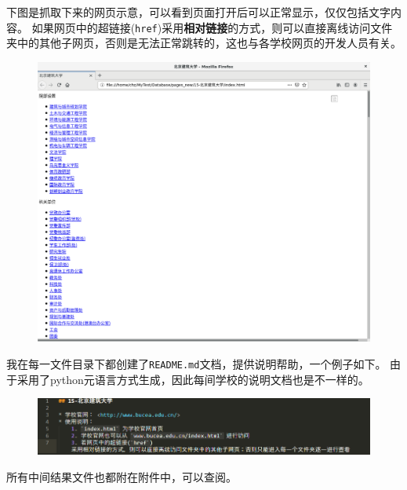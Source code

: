 \documentclass[logo,reportComp]{thesis}
\begin{document}
下图是抓取下来的网页示意，可以看到页面打开后可以正常显示，仅仅包括文字内容。
如果网页中的超链接(\verb'href')采用\textbf{相对链接}的方式，则可以直接离线访问文件夹中的其他子网页，否则是无法正常跳转的，这也与各学校网页的开发人员有关。
\begin{figure}[H]
\centering
\includegraphics[width=\linewidth]{fig/eg3.png}
\end{figure}

我在每一文件目录下都创建了\verb'README.md'文档，提供说明帮助，一个例子如下。
由于采用了python元语言方式生成，因此每间学校的说明文档也是不一样的。
\begin{figure}[H]
\centering
\includegraphics[width=\linewidth]{fig/readme.png}
\end{figure}

所有中间结果文件也都附在附件中，可以查阅。

\appendixconfig
\appendix
\end{document}

